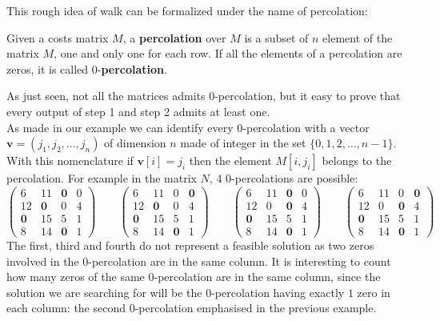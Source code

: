 \documentclass[12pt]{ClasseMatematicamente}
\begin{document}
\noindent
This rough idea of walk can be formalized under the name of percolation: 
\begin{definition}
Given a costs matrix $M$, a {\bf percolation} over $M$ is a subset of $n$ element of the matrix $M$, one and only one for each row. If all the elements of a percolation are zeros, it is called $0$-{\bf percolation}.
\end{definition}
As just seen, not all the matrices admits $0$-percolation, but it easy to prove that every output of step 1 and step 2 admits at least one. \\
As made in our example we can identify every $0$-percolation with a vector $\mathbf{v} = (j_1, j_2, \dots , j_n)$ of dimension $n$ made of integer in the set $\lbrace 0,1,2, \dots, n-1 \rbrace$. With this nomenclature if $\mathbf{v}[i] = j_i$ then the element $M[i,j_i]$ belongs to the percolation. 
For example in the matrix $N$, $4$ $0$-percolations are possible:
$$
\left(\begin{array}{rrrr}
6 & 11 & \mathbf{0} & 0 \\
12 & \mathbf{0} & 0 & 4 \\
\mathbf{0} & 15 & 5 & 1 \\
8 & 14 & \mathbf{0} & 1
\end{array}\right)
\qquad
\left(\begin{array}{rrrr}
6 & 11 & 0 & \mathbf{0} \\
12 & \mathbf{0} & 0 & 4 \\
\mathbf{0} & 15 & 5 & 1 \\
8 & 14 & \mathbf{0} & 1
\end{array}\right)
\qquad
\left(\begin{array}{rrrr}
6 & 11 & \mathbf{0} & 0 \\
12 & 0 & \mathbf{0} & 4 \\
\mathbf{0} & 15 & 5 & 1 \\
8 & 14 & \mathbf{0} & 1
\end{array}\right)
\qquad
\left(\begin{array}{rrrr}
6 & 11 & 0 & \mathbf{0} \\
12 & 0 & \mathbf{0} & 4 \\
\mathbf{0} & 15 & 5 & 1 \\
8 & 14 & \mathbf{0} & 1
\end{array}\right)
$$
The first, third and fourth do not represent a feasible solution as two zeros involved in the 0-percolation are in the same column.
It is interesting to count how many zeros of the same $0$-percolation are in the same column, since the solution we are searching for will be the $0$-percolation having exactly $1$ zero in each column: the second 0-percolation emphasised in the previous example.
\end{document}
